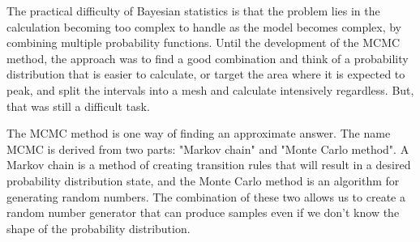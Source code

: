 \documentclass{ltjsarticle}
\begin{document}
The practical difficulty of Bayesian statistics is that the problem lies in the calculation becoming too complex to handle as the model becomes complex, by combining multiple probability functions. Until the development of the MCMC method, the approach was to find a good combination and think of a probability distribution that is easier to calculate, or target the area where it is expected to peak, and split the intervals into a mesh and calculate intensively regardless. But, that was still a difficult task.

The MCMC method is one way of finding an approximate answer. The name MCMC is derived from two parts: "Markov chain" and "Monte Carlo method". A Markov chain is a method of creating transition rules that will result in a desired probability distribution state, and the Monte Carlo method is an algorithm for generating random numbers. The combination of these two allows us to create a random number generator that can produce samples even if we don't know the shape of the probability distribution.
\end{document}
